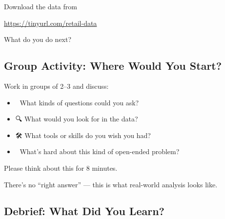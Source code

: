 \documentclass[
  letterpaper,
  DIV=11,
  numbers=noendperiod]{scrartcl}
\providecommand{\tightlist}{%
  \setlength{\itemsep}{0pt}\setlength{\parskip}{0pt}}
\begin{document}
Download the data from

\url{https://tinyurl.com/retail-data}

\begin{tcolorbox}[enhanced jigsaw, leftrule=.75mm, opacityback=0, colback=white, breakable, toprule=.15mm, rightrule=.15mm, left=2mm, colframe=quarto-callout-color-frame, arc=.35mm, bottomrule=.15mm]

What do you do next?

\end{tcolorbox}

\subsection{Group Activity: Where Would You
Start?}\label{group-activity-where-would-you-start}

Work in groups of 2--3 and discuss:

\begin{itemize}
\tightlist
\item
  🤔 What kinds of questions could you ask?
\item
  🔍 What would you look for in the data?
\item
  🛠️ What tools or skills do you wish you had?
\item
  💬 What's hard about this kind of open-ended problem?
\end{itemize}

Please think about this for 8 minutes.

\label{8minWaiting}

\begin{tcolorbox}[enhanced jigsaw, colbacktitle=quarto-callout-important-color!10!white, opacityback=0, colback=white, opacitybacktitle=0.6, toptitle=1mm, left=2mm, bottomrule=.15mm, breakable, bottomtitle=1mm, rightrule=.15mm, titlerule=0mm, title=\textcolor{quarto-callout-important-color}{\faExclamation}\hspace{0.5em}{Important}, coltitle=black, colframe=quarto-callout-important-color-frame, arc=.35mm, toprule=.15mm, leftrule=.75mm]

There's no ``right answer'' --- this is what real-world analysis looks
like.

\end{tcolorbox}

\subsection{Debrief: What Did You
Learn?}\label{debrief-what-did-you-learn}
\end{document}
